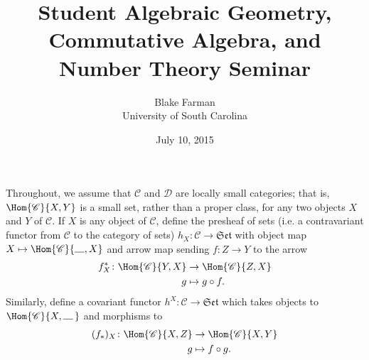 \documentclass[10pt]{amsart}
\author{Blake Farman\\University of South Carolina}
\title{Student Algebraic Geometry, Commutative Algebra, and Number Theory Seminar}
\date{July 10, 2015}
\begin{document}
\maketitle

\providecommand{\p}{\mathfrak{p}}
\providecommand{\m}{\mathfrak{m}}
\newcommand{\legendre}[2]{\left(\frac{#1}{#2}\right)}
\theoremstyle{plain}
\newtheorem{thm}{}
\newtheorem{lem}{Lemma}
\theoremstyle{definition}
\newtheorem{defn}{Definition}
\newtheorem{prop}{Proposition}
\newtheorem{cor}{Corollary}
\newtheorem{rmk}{Remark}

Throughout, we assume that $\mathscr{C}$ and $\mathscr{D}$ are locally small categories; that is, $\Hom{\mathscr{C}}{X,Y}$ is a small set, rather than a proper class, for any two objects $X$ and $Y$ of $\mathscr{C}$.
If $X$ is any object of $\mathscr{C}$, define the presheaf of sets (i.e. a contravariant functor from $\mathscr{C}$ to the category of sets) $h_X \colon \mathscr{C} \rightarrow \mathfrak{Set}$ with object map $X \mapsto \Hom{\mathscr{C}}{\line(1,0){10}, X}$ and arrow map sending $f : Z \rightarrow Y$ to the arrow
\begin{align*}
  f^*_X \colon \Hom{\mathscr{C}}{Y,X} &\rightarrow \Hom{\mathscr{C}}{Z,X}\\
  g &\mapsto g \circ f.
\end{align*}
Similarly, define a covariant functor $h^X : \mathscr{C} \rightarrow \mathfrak{Set}$ which takes objects to $\Hom{\mathscr{C}}{X,\, \line(1,0){10}}$ and morphisms to
\begin{align*}
  (f_*)_X \colon \Hom{\mathscr{C}}{X,Z} &\rightarrow \Hom{\mathscr{C}}{X,Y}\\
  g &\mapsto f \circ g.
\end{align*}
\end{document}
